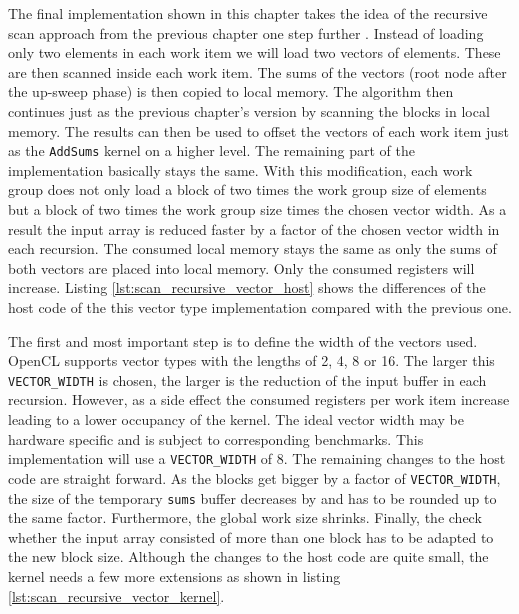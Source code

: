 The final implementation shown in this chapter takes the idea of the recursive scan approach from the previous chapter one step further \cite[ch.39.2.5]{gpu_gems_3_chapter_39}. Instead of loading only two elements in each work item we will load two vectors of elements. These are then scanned inside each work item. The sums of the vectors (root node after the up-sweep phase) is then copied to local memory. The algorithm then continues just as the previous chapter's version by scanning the blocks in local memory. The results can then be used to offset the vectors of each work item just as the \lstinline!AddSums! kernel on a higher level. The remaining part of the implementation basically stays the same.
With this modification, each work group does not only load a block of two times the work group size of elements but a block of two times the work group size times the chosen vector width. As a result the input array is reduced faster by a factor of the chosen vector width in each recursion. The consumed local memory stays the same as only the sums of both vectors are placed into local memory. Only the consumed registers will increase.
Listing \ref{lst:scan_recursive_vector_host} shows the differences of the host code of the this vector type implementation compared with the previous one.



The first and most important step is to define the width of the vectors used. OpenCL supports vector types with the lengths of 2, 4, 8 or 16. The larger this \lstinline!VECTOR_WIDTH! is chosen, the larger is the reduction of the input buffer in each recursion. However, as a side effect the consumed registers per work item increase leading to a lower occupancy of the kernel. The ideal vector width may be hardware specific and is subject to corresponding benchmarks. This implementation will use a \lstinline!VECTOR_WIDTH! of 8.
The remaining changes to the host code are straight forward. As the blocks get bigger by a factor of \lstinline!VECTOR_WIDTH!, the size of the temporary \lstinline!sums! buffer decreases by and has to be rounded up to the same factor. Furthermore, the global work size shrinks. Finally, the check whether the input array consisted of more than one block has to be adapted to the new block size.
Although the changes to the host code are quite small, the kernel needs a few more extensions as shown in listing \ref{lst:scan_recursive_vector_kernel}.

